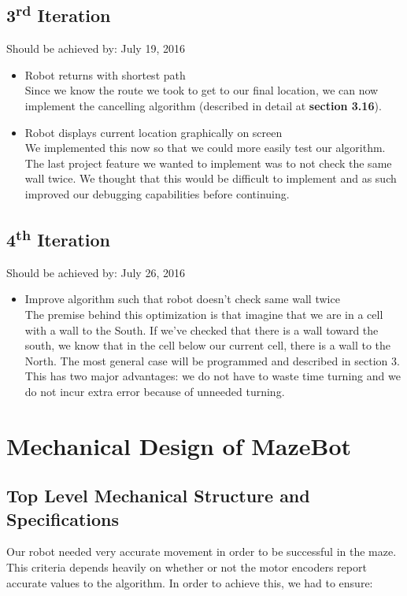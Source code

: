 \documentclass[11pt]{article}
\newcommand{\ts}{\textsuperscript}
\begin{document}
\subsection{3\ts{rd} Iteration}
Should be achieved by: July 19, 2016
\begin{itemize}
\item Robot returns with shortest path\\
Since we know the route we took to get to our final location, we can now implement the cancelling algorithm (described in detail at \textbf{section 3.16}).
\item Robot displays current location graphically on screen\\
We implemented this now so that we could more easily test our algorithm. The last project feature we wanted to implement was to not check the same wall twice. We thought that this would be difficult to implement and as such improved our debugging capabilities before continuing.
\end{itemize}

\subsection{4\ts{th} Iteration}
Should be achieved by: July 26, 2016
\begin{itemize}
\item Improve algorithm such that robot doesn't check same wall twice\\
The premise behind this optimization is that imagine that we are in a cell with a wall to the South. If we've checked that there is a wall toward the south, we know that in the cell below our current cell, there is a wall to the North. The most general case will be programmed and described in section 3. This has two major advantages: we do not have to waste time turning and we do not incur extra error because of unneeded turning.
\end{itemize}
\newpage




\section{Mechanical Design of MazeBot}
\subsection{Top Level Mechanical Structure and Specifications}
Our robot needed very accurate movement in order to be successful in the maze. This criteria depends heavily on whether or not the motor encoders report accurate values to the algorithm. In order to achieve this, we had to ensure:
\end{document}
